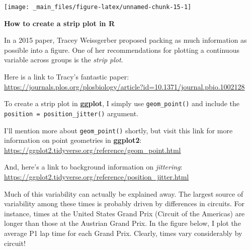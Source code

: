\documentclass[
]{book}
\begin{document}
\begin{center}\texttt{[image: \_main\_files/figure-latex/unnamed-chunk-15-1]} \end{center}

\begin{blackbox}

\begin{center}
\textbf{How to create a strip plot in R}

\end{center}

In a 2015 paper, Tracey Weissgerber proposed packing as much information as possible into a figure. One of her recommendations for plotting a continuous variable across groups is the \emph{strip plot}.

Here is a link to Tracy's fantastic paper: \url{https://journals.plos.org/plosbiology/article?id=10.1371/journal.pbio.1002128}

To create a strip plot in \textbf{ggplot}, I simply use \texttt{geom\_point()} and include the \texttt{position\ =\ position\_jitter()} argument.

I'll mention more about \texttt{geom\_point()} shortly, but visit this link for more information on point geometries in \textbf{ggplot2}: \url{https://ggplot2.tidyverse.org/reference/geom_point.html}

And, here's a link to background information on \emph{jittering}: \url{https://ggplot2.tidyverse.org/reference/position_jitter.html}

\end{blackbox}

Much of this variability can actually be explained away. The largest source of variability among these times is probably driven by differences in circuits. For instance, times at the United States Grand Prix (Circuit of the Americas) are longer than those at the Austrian Grand Prix. In the figure below, I plot the average P1 lap time for each Grand Prix. Clearly, times vary considerably by circuit!
\end{document}
